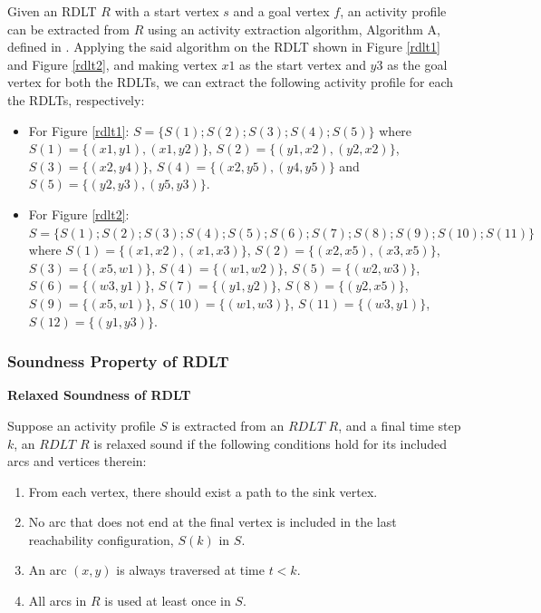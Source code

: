         Given an RDLT $R$ with a start vertex $s$ and a goal vertex $f$, an activity profile can be extracted from $R$ using an activity extraction algorithm, Algorithm A, defined in \cite{malinao-rdlt}. Applying the said algorithm on the RDLT shown in Figure \ref{rdlt1} and Figure \ref{rdlt2}, and making vertex $x1$ as the start vertex and $y3$ as the goal vertex for both the RDLTs, we can extract the following activity profile for each the RDLTs, respectively:

        \begin{itemize}
            
            \item For Figure \ref{rdlt1}: $S = \{S(1);S(2);S(3);S(4);S(5)\}$ where $S(1) = \{(x1,y1),(x1,y2)\}$, $S(2) = \{(y1,x2),(y2,x2)\}$, $S(3) = \{(x2,y4)\}$, $S(4) = \{(x2,y5),(y4,y5)\}$ and $S(5) = \{(y2,y3),(y5,y3)\}$. 

            \item For Figure \ref{rdlt2}: $S = \{S(1);S(2);S(3);S(4);S(5);S(6);S(7);S(8);S(9);S(10);S(11)\}$ where $S(1) = \{(x1,x2),(x1,x3)\}$, $S(2) = \{(x2,x5),(x3,x5)\}$, $S(3) = \{(x5,w1)\}$, $S(4) = \{(w1,w2)\}$, $S(5) = \{(w2,w3)\}$, $S(6) = \{(w3,y1)\}$, $S(7) = \{(y1,y2)\}$, $S(8) = \{(y2,x5)\}$, $S(9) = \{(x5,w1)\}$, $S(10) = \{(w1,w3)\}$, $S(11) = \{(w3,y1)\}$, $S(12) = \{(y1,y3)\}$.
        
        \end{itemize}

        \subsubsection*{Soundness Property of RDLT}

        \begin{definition} \textbf{Relaxed Soundness of RDLT} \cite{malinao-rdlt}

        Suppose an activity profile $S$ is extracted from an $RDLT$ $R$, and a final time step $k$, an $RDLT$ $R$ is relaxed sound if the following conditions hold for its included arcs and vertices therein:

        \begin{enumerate}
            
            \item From each vertex, there should exist a path to the sink vertex.

            \item No arc that does not end at the final vertex is included in the last reachability configuration, $S(k)$ in $S$.

            \item An arc $(x,y)$ is always traversed at time $t < k$.

            \item All arcs in $R$ is used at least once in $S$.
            
        \end{enumerate}
            
        \end{definition}

